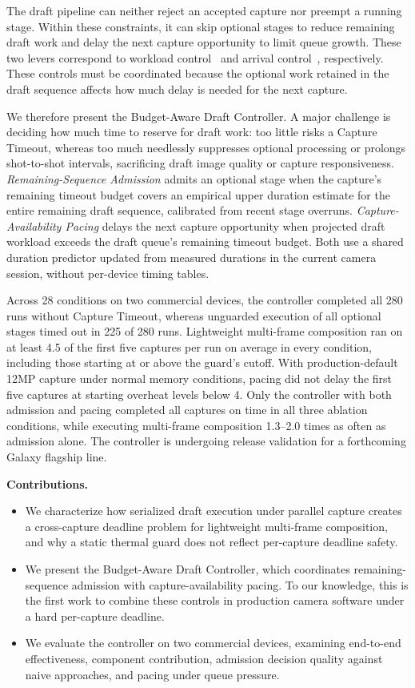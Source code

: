 The draft pipeline can neither reject an accepted capture nor preempt a running stage.
Within these constraints, it can skip optional stages to reduce remaining draft work and delay the next capture opportunity to limit queue growth.
These two levers correspond to workload control~\cite{approxdet-sensys,timecard-sosp} and arrival control~\cite{seda-sosp,breakwater-osdi}, respectively.
These controls must be coordinated because the optional work retained in the draft sequence affects how much delay is needed for the next capture.

We therefore present the Budget-Aware Draft Controller.
A major challenge is deciding how much time to reserve for draft work: too little risks a Capture Timeout, whereas too much needlessly suppresses optional processing or prolongs shot-to-shot intervals, sacrificing draft image quality or capture responsiveness.
\emph{Remaining-Sequence Admission} admits an optional stage when the capture's remaining timeout budget covers an empirical upper duration estimate for the entire remaining draft sequence, calibrated from recent stage overruns.
\emph{Capture-Availability Pacing} delays the next capture opportunity when projected draft workload exceeds the draft queue's remaining timeout budget.
Both use a shared duration predictor updated from measured durations in the current camera session, without per-device timing tables.

Across 28 conditions on two commercial devices, the controller completed all 280 runs without Capture Timeout, whereas unguarded execution of all optional stages timed out in 225 of 280 runs.
Lightweight multi-frame composition ran on at least 4.5 of the first five captures per run on average in every condition, including those starting at or above the guard's cutoff.
With production-default 12MP capture under normal memory conditions, pacing did not delay the first five captures at starting overheat levels below 4.
Only the controller with both admission and pacing completed all captures on time in all three ablation conditions, while executing multi-frame composition 1.3--2.0 times as often as admission alone.
The controller is undergoing release validation for a forthcoming Galaxy flagship line.

\smallskip\noindent\textbf{Contributions.}
\begin{itemize}[leftmargin=1.2em]
  \item We characterize how serialized draft execution under parallel capture creates a cross-capture deadline problem for lightweight multi-frame composition, and why a static thermal guard does not reflect per-capture deadline safety.
  \item We present the Budget-Aware Draft Controller, which coordinates remaining-sequence admission with capture-availability pacing. To our knowledge, this is the first work to combine these controls in production camera software under a hard per-capture deadline.
  \item We evaluate the controller on two commercial devices, examining end-to-end effectiveness, component contribution, admission decision quality against naive approaches, and pacing under queue pressure.
\end{itemize}
